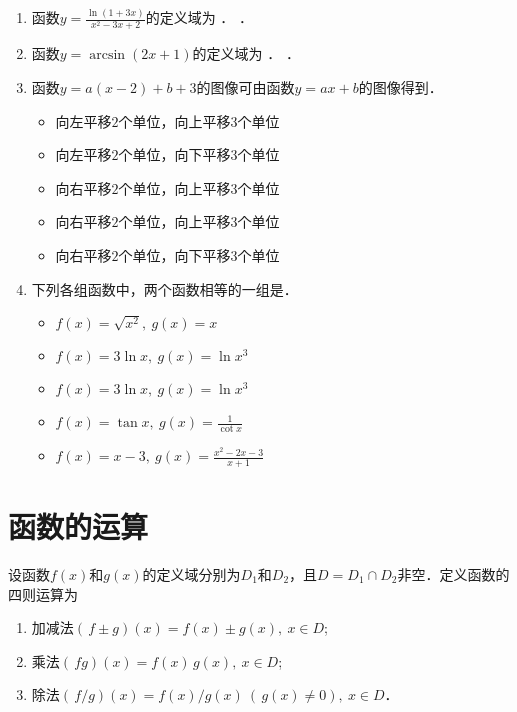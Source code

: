 \begin{enumerate}
\item 函数\(\displaystyle y = \frac{\ln(1+3x)}{x^2-3x+2}\)的定义域为
  \ifshowsol
  \uline{}．
  \else
  \uline{\makebox[13em]{}}．
  \fi

\item 函数\(y = \arcsin(2x+1)\)的定义域为
  \ifshowsol
    \uline{}．
  \else
  \uline{\makebox[9em]{}}．
  \fi

\item 函数\(y = a(x-2) + b + 3\)的图像可由函数\(y = ax + b\)的图像\uline{\makebox[4em]{}}得到．
  \begin{itemize}
    \renewcommand{\labelitemi}{\faCircleThin}
  \item 向左平移\(2\)个单位，向上平移\(3\)个单位
  \item 向左平移\(2\)个单位，向下平移\(3\)个单位
    \ifshowsol
  \item[\faCircle] 向右平移\(2\)个单位，向上平移\(3\)个单位
    \else
  \item 向右平移\(2\)个单位，向上平移\(3\)个单位
    \fi
  \item 向右平移\(2\)个单位，向下平移\(3\)个单位
  \end{itemize}

\item 下列各组函数中，两个函数相等的一组是\uline{\makebox[4em]{}}．
  \begin{itemize}
    \renewcommand{\labelitemi}{\faCircleThin}
  \item \(f(x) = \sqrt{x^2},\ g(x) = x\)
    \ifshowsol
  \item[\faCircle] \(f(x) = 3\ln x,\ g(x) = \ln x^3\)
    \else
  \item \(f(x) = 3\ln x,\ g(x) = \ln x^3\)
    \fi
  \item \(f(x) = \tan x,\ g(x) = \frac1{\cot x}\)
  \item \(f(x) = x - 3,\ g(x) = \frac{x^2-2x-3}{x+1}\)
  \end{itemize}
\end{enumerate}
\fi

\section{函数的运算\label{sec:funcops}}

\begin{definition}
  \label{defn:func4ops}
  设函数\(f(x)\)和\(g(x)\)的定义域分别为\(D_1\)和\(D_2\)，且\(D = D_1 \cap D_2\)非空．定义函数的四则运算为
  \begin{enumerate}
    \renewcommand{\labelenumi}{\enumparen{\arabic{enumi}}}
  \item 加减法\((\,f \pm g)(x) = f(x) \pm g(x),\ x \in D\);
  \item 乘法\((\,fg)(x) = f(x) \, g(x),\ x \in D\);
  \item 除法\((\,f/g)(x) = f(x) / g(x)\ (\,g(x) \ne 0),\ x \in D\)．
  \end{enumerate}
\end{definition}

